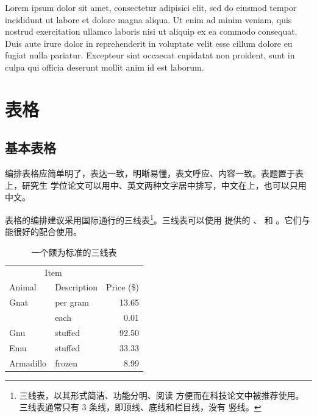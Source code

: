 Lorem ipsum dolor sit amet, consectetur adipisici elit, sed do eiusmod tempor
incididunt ut labore et dolore magna aliqua. Ut enim ad minim veniam, quis
nostrud exercitation ullamco laboris nisi ut aliquip ex ea commodo consequat.
Duis aute irure dolor in reprehenderit in voluptate velit esse cillum dolore eu
fugiat nulla pariatur. Excepteur sint occaecat cupidatat non proident, sunt in
culpa qui officia deserunt mollit anim id est laborum.

\section{表格}

\subsection{基本表格}

编排表格应简单明了，表达一致，明晰易懂，表文呼应、内容一致。表题置于表上，研究生
学位论文可以用中、英文两种文字居中排写，中文在上，也可以只用中文。

表格的编排建议采用国际通行的三线表\footnote{三线表，以其形式简洁、功能分明、阅读
方便而在科技论文中被推荐使用。三线表通常只有 3 条线，即顶线、底线和栏目线，没有
竖线。}。三线表可以使用  提供的 、 和
。它们与  能很好的配合使用。

\begin{table}[!hpt]
  \caption[一个颇为标准的三线表]{一个颇为标准的三线表\footnotemark}
  \label{tab:firstone}
  \centering
  \begin{tabular}{@{}llr@{}} \toprule
    \multicolumn{2}{c}{Item} \\ \cmidrule(r){1-2}
    Animal & Description & Price (\$)\\ \midrule
    Gnat  & per gram  & 13.65 \\
          & each      & 0.01 \\
    Gnu   & stuffed   & 92.50 \\
    Emu   & stuffed   & 33.33 \\
    Armadillo & frozen & 8.99 \\ \bottomrule
  \end{tabular}
\end{table}

